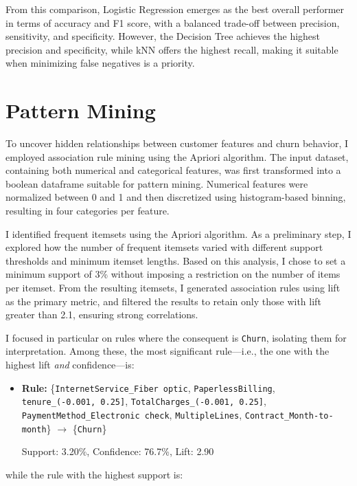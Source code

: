 \documentclass[a4paper,11pt]{article}
\begin{document}
From this comparison, Logistic Regression emerges as the best overall performer in terms of accuracy and F1 score, with a balanced trade-off between precision, sensitivity, and specificity. However, the Decision Tree achieves the highest precision and specificity, while kNN offers the highest recall, making it suitable when minimizing false negatives is a priority.

\section{Pattern Mining}

To uncover hidden relationships between customer features and churn behavior, I employed association rule mining using the Apriori algorithm. The input dataset, containing both numerical and categorical features, was first transformed into a boolean dataframe suitable for pattern mining. Numerical features were normalized between 0 and 1 and then discretized using histogram-based binning, resulting in four categories per feature.

I identified frequent itemsets using the Apriori algorithm. As a preliminary step, I explored how the number of frequent itemsets varied with different support thresholds and minimum itemset lengths. Based on this analysis, I chose to set a minimum support of 3\% without imposing a restriction on the number of items per itemset. From the resulting itemsets, I generated association rules using lift as the primary metric, and filtered the results to retain only those with lift greater than 2.1, ensuring strong correlations.

I focused in particular on rules where the consequent is \texttt{Churn}, isolating them for interpretation. Among these, the most significant rule—i.e., the one with the highest lift \textit{and} confidence—is:

\begin{itemize}
\sloppy
\item \textbf{Rule:} \{\texttt{InternetService\_Fiber optic}, \texttt{PaperlessBilling}, \texttt{tenure\_(-0.001, 0.25]}, \texttt{TotalCharges\_(-0.001, 0.25]}, \texttt{PaymentMethod\_Electronic check}, \texttt{MultipleLines}, \texttt{Contract\_Month-to-month}\} $\rightarrow$ \{\texttt{Churn}\}

Support: 3.20\%, Confidence: 76.7\%, Lift: 2.90
\end{itemize}

while the rule with the highest support is:
\end{document}
